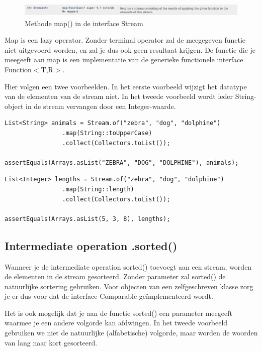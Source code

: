 \begin{figure}[H]
  \includegraphics[width=\linewidth]{images/chapter_streams/stream_map.png}
  \caption{Methode map() in de interface Stream}
  \label{fig:stream_foreach}
\end{figure}

Map is een lazy operator. Zonder terminal operator zal de meegegeven functie niet uitgevoerd worden, en zal je dus ook geen resultaat krijgen. De functie die je meegeeft aan map is een implementatie van de generieke functionele interface Function$<$T,R$>$.

Hier volgen een twee voorbeelden. In het eerste voorbeeld wijzigt het datatype van de elementen van de stream niet. In het tweede voorbeeld wordt ieder String-object in de stream vervangen door een Integer-waarde.

\begin{lstlisting}
List<String> animals = Stream.of("zebra", "dog", "dolphine")
				.map(String::toUpperCase)
				.collect(Collectors.toList());

assertEquals(Arrays.asList("ZEBRA", "DOG", "DOLPHINE"), animals);
\end{lstlisting}

\begin{lstlisting}
List<Integer> lengths = Stream.of("zebra", "dog", "dolphine")
				.map(String::length)
				.collect(Collectors.toList());

assertEquals(Arrays.asList(5, 3, 8), lengths);
\end{lstlisting}

\subsection{Intermediate operation .sorted()}

Wanneer je de intermediate operation sorted() toevoegt aan een stream, worden de elementen in de stream gesorteerd. Zonder parameter zal sorted() de natuurlijke sortering gebruiken. Voor objecten van een zelfgeschreven klasse zorg je er dus voor dat de interface Comparable ge\"implementeerd wordt.

Het is ook mogelijk dat je aan de functie sorted() een parameter meegeeft waarmee je een andere volgorde kan afdwingen. In het tweede voorbeeld gebruiken we niet de natuurlijke (alfabetische) volgorde, maar worden de woorden van lang naar kort gesorteerd.


